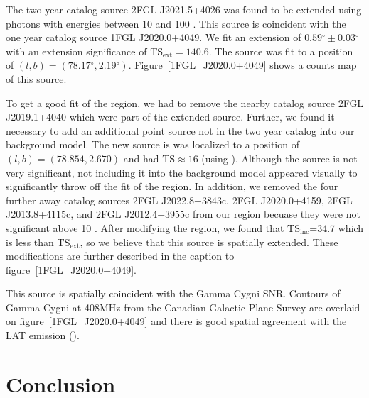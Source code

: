 \documentclass[12pt,preprint]{aastex}
\newcommand{\gev}{\text{GeV}\xspace}
\newcommand{\tsext}{{\ensuremath{\text{TS}_\text{ext}}}\xspace}
\newcommand{\tsinc}{\ensuremath{\text{TS}_\text{inc}}\xspace}
\newcommand{\ts}{\text{TS}\xspace}
\renewcommand{\deg}{\ensuremath{^\circ}\xspace}
\newcommand{\pointlike}{\text{\em pointlike}\xspace}
\begin{document}

The two year catalog source 2FGL J2021.5+4026 was found to be extended
using photons with energies between 10 \gev and 100 \gev. This source
is coincident with the one year catalog source 1FGL J2020.0+4049. We
fit an extension of $0.59\deg\pm0.03\deg$ with an extension
significance of $\tsext=140.6$.  The source was fit to a position of
$(l,b)=(78.17\deg,2.19\deg)$.  Figure~\ref{1FGL_J2020.0+4049} shows a
counts map of this source.

To get a good fit of the region, we had to remove the nearby catalog
source 2FGL J2019.1+4040 which were part of the extended source.
Further, we found it necessary to add an additional point source not in
the two year catalog into our background model.  The new source is was
localized to a position of $(l,b)=(78.854,2.670)$ and had $\ts\approx 16$
(using \pointlike).  Although the source is not very significant, not
including it into the background model appeared visually to significantly
throw off the fit of the region.  In addition, we removed the four
further away catalog sources 2FGL J2022.8+3843c, 2FGL J2020.0+4159,
2FGL J2013.8+4115c, and 2FGL J2012.4+3955c from our region becuase they
were not significant above 10 \gev.  After modifying the region, we found
that \tsinc=34.7 which is less than \tsext, so we believe that this
source is spatially extended.  These modifications are further described
in the caption to figure~\ref{1FGL_J2020.0+4049}.

This source is spatially coincident with the Gamma Cygni SNR.  Contours of
Gamma Cygni at 408MHz from the Canadian Galactic Plane Survey are overlaid
on figure~\ref{1FGL_J2020.0+4049} and there is good spatial agreement
with the LAT emission (\cite{canadian_galactic_plane_survey}).


\section{Conclusion}
\end{document}
